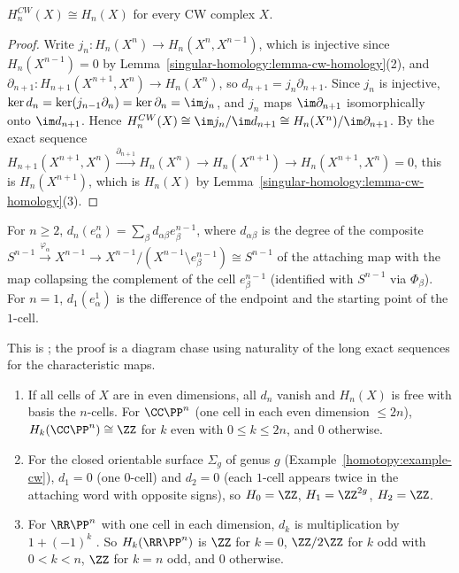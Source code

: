 \begin{theorem}\label{singular-homology:theorem-cellular}
$H^{CW}_n(X) \cong H_n(X)$ for every CW complex $X$.
\end{theorem}

\begin{proof}
Write $j_n \colon H_n(X^n) \to H_n(X^n, X^{n-1})$, which is injective since $H_n(X^{n-1}) = 0$ by Lemma~\ref{singular-homology:lemma-cw-homology}(2), and
$\partial_{n+1} \colon H_{n+1}(X^{n+1}, X^n) \to H_n(X^n)$, so $d_{n+1} = j_n\partial_{n+1}$. Since $j_n$ is injective, $\ker d_n = \ker(j_{n-1}\partial_n) = \ker\partial_n = \im j_n$, and
$j_n$ maps $\im\partial_{n+1}$ isomorphically onto $\im d_{n+1}$. Hence
$H^{CW}_n(X) \cong \im j_n/\im d_{n+1} \cong H_n(X^n)/\im\partial_{n+1}$. By the exact sequence $H_{n+1}(X^{n+1}, X^n) \xrightarrow{\partial_{n+1}} H_n(X^n) \to H_n(X^{n+1}) \to H_n(X^{n+1}, X^n) = 0$,
this is $H_n(X^{n+1})$, which is $H_n(X)$ by Lemma~\ref{singular-homology:lemma-cw-homology}(3).
\end{proof}

\begin{theorem}\label{singular-homology:theorem-cellular-boundary}
For $n \geq 2$, $d_n(e^n_\alpha) = \sum_\beta d_{\alpha\beta}e^{n-1}_\beta$, where $d_{\alpha\beta}$ is the degree of the composite
$S^{n-1} \xrightarrow{\varphi_\alpha} X^{n-1} \to X^{n-1}/(X^{n-1} \setminus e^{n-1}_\beta) \cong S^{n-1}$ of the attaching map with the map collapsing the complement of
the cell $e^{n-1}_\beta$ (identified with $S^{n-1}$ via $\Phi_\beta$). For $n = 1$, $d_1(e^1_\alpha)$ is the difference of the endpoint and the starting point of the
$1$-cell.
\end{theorem}

This is \cite[Section 2.2, Cellular Boundary Formula]{hatcher-at}; the proof is a diagram chase using naturality of the long exact sequences for the characteristic
maps.

\begin{example}\label{singular-homology:example-cellular-computations}
\begin{enumerate}
\item If all cells of $X$ are in even dimensions, all $d_n$ vanish and $H_n(X)$ is free with basis the $n$-cells. For $\CC\PP^n$ (one cell in each even dimension
$\leq 2n$), $H_k(\CC\PP^n) \cong \ZZ$ for $k$ even with $0 \leq k \leq 2n$, and $0$ otherwise.
\item For the closed orientable surface $\Sigma_g$ of genus $g$ (Example~\ref{homotopy:example-cw}), $d_1 = 0$ (one $0$-cell) and $d_2 = 0$ (each $1$-cell appears twice
in the attaching word with opposite signs), so $H_0 = \ZZ$, $H_1 = \ZZ^{2g}$, $H_2 = \ZZ$.
\item For $\RR\PP^n$ with one cell in each dimension, $d_k$ is multiplication by $1 + (-1)^k$ \cite[Example 2.42]{hatcher-at}. So $H_k(\RR\PP^n)$ is $\ZZ$ for $k = 0$,
$\ZZ/2\ZZ$ for $k$ odd with $0 < k < n$, $\ZZ$ for $k = n$ odd, and $0$ otherwise.
\end{enumerate}
\end{example}

